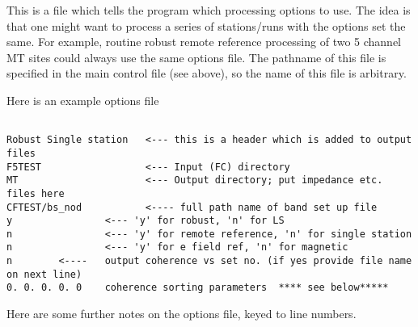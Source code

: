 This is a file which tells the program which processing options to use.
The idea is that one might want to process a series of stations/runs with the options set
the same.  For example, routine robust remote reference processing of
two 5 channel MT sites could always use the same options file.
The pathname of this file is specified in the main control file 
(see above), so the name of this file is arbitrary.

Here is an example options file
\small

\begin{verbatim}

Robust Single station   <--- this is a header which is added to output files
F5TEST                  <--- Input (FC) directory
MT                      <--- Output directory; put impedance etc. files here
CFTEST/bs_nod           <---- full path name of band set up file
y                <--- 'y' for robust, 'n' for LS
n                <--- 'y' for remote reference, 'n' for single station
n                <--- 'y' for e field ref, 'n' for magnetic 
n        <----   output coherence vs set no. (if yes provide file name on next line)
0. 0. 0. 0. 0    coherence sorting parameters  **** see below*****
\end{verbatim}
\normalsize

Here are some further notes on the options file, keyed to line numbers.

